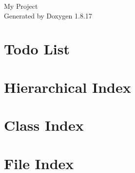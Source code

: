 \let\mypdfximage\pdfximage\def\pdfximage{\immediate\mypdfximage}\documentclass[twoside]{book}
\newcommand{\+}{\discretionary{\mbox{\scriptsize$\hookleftarrow$}}{}{}}
\newcommand{\clearemptydoublepage}{%
  \newpage{\pagestyle{empty}\cleardoublepage}%
}
\begin{document}
\hypersetup{pageanchor=false,
             bookmarksnumbered=true,
             pdfencoding=unicode
            }
\begin{titlepage}
\vspace*{7cm}
\begin{center}%
{\Large My Project }\\
\vspace*{1cm}
{\large Generated by Doxygen 1.8.17}\\
\end{center}
\end{titlepage}
\clearemptydoublepage
{}
\tableofcontents
\clearemptydoublepage
{}
\hypersetup{pageanchor=true}

\chapter{Todo List}
\label{todo}

\chapter{Hierarchical Index}

\chapter{Class Index}

\chapter{File Index}

\end{document}
